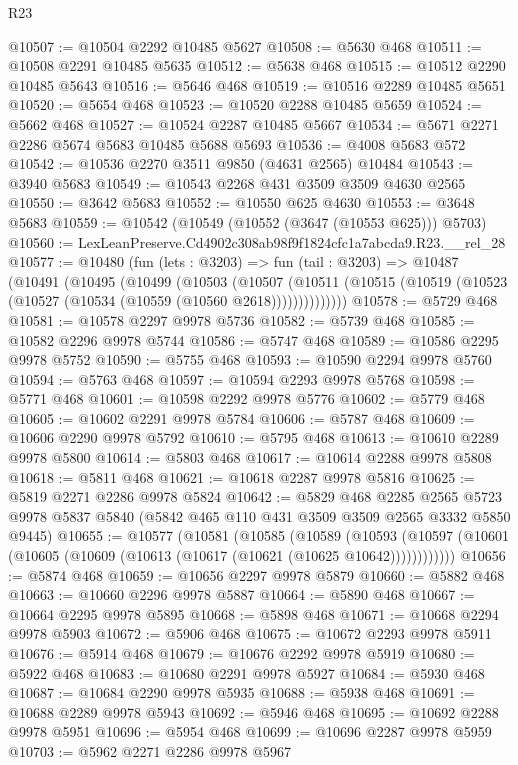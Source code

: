\begin{lexlean}{R23}
\begin{coremodule}
@10507 := @10504 @2292 @10485 @5627
@10508 := @5630 @468
@10511 := @10508 @2291 @10485 @5635
@10512 := @5638 @468
@10515 := @10512 @2290 @10485 @5643
@10516 := @5646 @468
@10519 := @10516 @2289 @10485 @5651
@10520 := @5654 @468
@10523 := @10520 @2288 @10485 @5659
@10524 := @5662 @468
@10527 := @10524 @2287 @10485 @5667
@10534 := @5671 @2271 @2286 @5674 @5683 @10485 @5688 @5693
@10536 := @4008 @5683 @572
@10542 := @10536 @2270 @3511 @9850 (@4631 @2565) @10484
@10543 := @3940 @5683
@10549 := @10543 @2268 @431 @3509 @3509 @4630 @2565
@10550 := @3642 @5683
@10552 := @10550 @625 @4630
@10553 := @3648 @5683
@10559 := @10542 (@10549 (@10552 (@3647 (@10553 @625))) @5703)
@10560 := LexLeanPreserve.Cd4902c308ab98f9f1824cfc1a7abcda9.R23.__rel_28
@10577 := @10480
    (fun (lets : @3203) =>
    fun (tail : @3203) =>
    @10487
      (@10491
        (@10495
          (@10499
            (@10503
              (@10507
                (@10511 (@10515 (@10519 (@10523 (@10527 (@10534 (@10559 (@10560 @2618))))))))))))))
@10578 := @5729 @468
@10581 := @10578 @2297 @9978 @5736
@10582 := @5739 @468
@10585 := @10582 @2296 @9978 @5744
@10586 := @5747 @468
@10589 := @10586 @2295 @9978 @5752
@10590 := @5755 @468
@10593 := @10590 @2294 @9978 @5760
@10594 := @5763 @468
@10597 := @10594 @2293 @9978 @5768
@10598 := @5771 @468
@10601 := @10598 @2292 @9978 @5776
@10602 := @5779 @468
@10605 := @10602 @2291 @9978 @5784
@10606 := @5787 @468
@10609 := @10606 @2290 @9978 @5792
@10610 := @5795 @468
@10613 := @10610 @2289 @9978 @5800
@10614 := @5803 @468
@10617 := @10614 @2288 @9978 @5808
@10618 := @5811 @468
@10621 := @10618 @2287 @9978 @5816
@10625 := @5819 @2271 @2286 @9978 @5824
@10642 := @5829
    @468
    @2285
    @2565
    @5723
    @9978
    @5837
    @5840
    (@5842 @465 @110 @431 @3509 @3509 @2565 @3332 @5850 @9445)
@10655 := @10577
    (@10581
      (@10585
        (@10589
          (@10593 (@10597 (@10601 (@10605 (@10609 (@10613 (@10617 (@10621 (@10625 @10642))))))))))))
@10656 := @5874 @468
@10659 := @10656 @2297 @9978 @5879
@10660 := @5882 @468
@10663 := @10660 @2296 @9978 @5887
@10664 := @5890 @468
@10667 := @10664 @2295 @9978 @5895
@10668 := @5898 @468
@10671 := @10668 @2294 @9978 @5903
@10672 := @5906 @468
@10675 := @10672 @2293 @9978 @5911
@10676 := @5914 @468
@10679 := @10676 @2292 @9978 @5919
@10680 := @5922 @468
@10683 := @10680 @2291 @9978 @5927
@10684 := @5930 @468
@10687 := @10684 @2290 @9978 @5935
@10688 := @5938 @468
@10691 := @10688 @2289 @9978 @5943
@10692 := @5946 @468
@10695 := @10692 @2288 @9978 @5951
@10696 := @5954 @468
@10699 := @10696 @2287 @9978 @5959
@10703 := @5962 @2271 @2286 @9978 @5967

\end{coremodule}
\end{lexlean}

